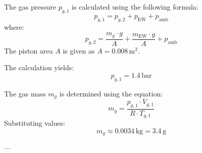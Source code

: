 The gas pressure \( p_{g,1} \) is calculated using the following formula:  
\[
p_{g,1} = p_{g,2} + p_{\text{EW}} + p_{\text{amb}}
\]  
where:  
\[
p_{g,2} = \frac{m_g \cdot g}{A} + \frac{m_{\text{EW}} \cdot g}{A} + p_{\text{amb}}
\]  
The piston area \( A \) is given as \( A = 0.008 \, \text{m}^2 \).  

The calculation yields:  
\[
p_{g,1} = 1.4 \, \text{bar}
\]  

The gas mass \( m_g \) is determined using the equation:  
\[
m_g = \frac{p_{g,1} \cdot V_{g,1}}{R \cdot T_{g,1}}
\]  
Substituting values:  
\[
m_g \approx 0.0034 \, \text{kg} = 3.4 \, \text{g}
\]  

---